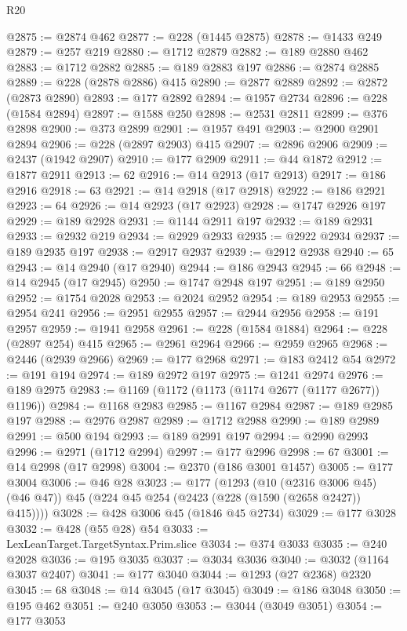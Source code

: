 \begin{lexlean}{R20}
\begin{coremodule}
@2875 := @2874 @462
@2877 := @228 (@1445 @2875)
@2878 := @1433 @249
@2879 := @257 @219
@2880 := @1712 @2879
@2882 := @189 @2880 @462
@2883 := @1712 @2882
@2885 := @189 @2883 @197
@2886 := @2874 @2885
@2889 := @228 (@2878 @2886) @415
@2890 := @2877 @2889
@2892 := @2872 (@2873 @2890)
@2893 := @177 @2892
@2894 := @1957 @2734
@2896 := @228 (@1584 @2894)
@2897 := @1588 @250
@2898 := @2531 @2811
@2899 := @376 @2898
@2900 := @373 @2899
@2901 := @1957 @491
@2903 := @2900 @2901 @2894
@2906 := @228 (@2897 @2903) @415
@2907 := @2896 @2906
@2909 := @2437 (@1942 @2907)
@2910 := @177 @2909
@2911 := @44 @1872
@2912 := @1877 @2911
@2913 := 62
@2916 := @14 @2913 (@17 @2913)
@2917 := @186 @2916
@2918 := 63
@2921 := @14 @2918 (@17 @2918)
@2922 := @186 @2921
@2923 := 64
@2926 := @14 @2923 (@17 @2923)
@2928 := @1747 @2926 @197
@2929 := @189 @2928
@2931 := @1144 @2911 @197
@2932 := @189 @2931
@2933 := @2932 @219
@2934 := @2929 @2933
@2935 := @2922 @2934
@2937 := @189 @2935 @197
@2938 := @2917 @2937
@2939 := @2912 @2938
@2940 := 65
@2943 := @14 @2940 (@17 @2940)
@2944 := @186 @2943
@2945 := 66
@2948 := @14 @2945 (@17 @2945)
@2950 := @1747 @2948 @197
@2951 := @189 @2950
@2952 := @1754 @2028
@2953 := @2024 @2952
@2954 := @189 @2953
@2955 := @2954 @241
@2956 := @2951 @2955
@2957 := @2944 @2956
@2958 := @191 @2957
@2959 := @1941 @2958
@2961 := @228 (@1584 @1884)
@2964 := @228 (@2897 @254) @415
@2965 := @2961 @2964
@2966 := @2959 @2965
@2968 := @2446 (@2939 @2966)
@2969 := @177 @2968
@2971 := @183 @2412 @54
@2972 := @191 @194
@2974 := @189 @2972 @197
@2975 := @1241 @2974
@2976 := @189 @2975
@2983 := @1169 (@1172 (@1173 (@1174 @2677 (@1177 @2677)) @1196))
@2984 := @1168 @2983
@2985 := @1167 @2984
@2987 := @189 @2985 @197
@2988 := @2976 @2987
@2989 := @1712 @2988
@2990 := @189 @2989
@2991 := @500 @194
@2993 := @189 @2991 @197
@2994 := @2990 @2993
@2996 := @2971 (@1712 @2994)
@2997 := @177 @2996
@2998 := 67
@3001 := @14 @2998 (@17 @2998)
@3004 := @2370 (@186 @3001 @1457)
@3005 := @177 @3004
@3006 := @46 @28
@3023 := @177
    (@1293
      (@10 (@2316 @3006 @45) (@46 @47))
      @45
      (@224 @45 @254 (@2423 (@228 (@1590 (@2658 @2427)) @415))))
@3028 := @428 @3006 @45 (@1846 @45 @2734)
@3029 := @177 @3028
@3032 := @428 (@55 @28) @54
@3033 := LexLeanTarget.TargetSyntax.Prim.slice
@3034 := @374 @3033
@3035 := @240 @2028
@3036 := @195 @3035
@3037 := @3034 @3036
@3040 := @3032 (@1164 @3037 @2407)
@3041 := @177 @3040
@3044 := @1293 (@27 @2368) @2320
@3045 := 68
@3048 := @14 @3045 (@17 @3045)
@3049 := @186 @3048
@3050 := @195 @462
@3051 := @240 @3050
@3053 := @3044 (@3049 @3051)
@3054 := @177 @3053

\end{coremodule}
\end{lexlean}
